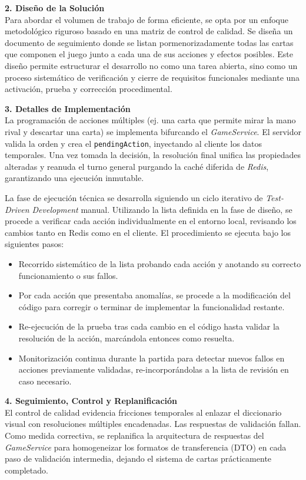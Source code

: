 \textbf{2. Diseño de la Solución} \\
Para abordar el volumen de trabajo de forma eficiente, se opta por un enfoque metodológico riguroso basado en una matriz de control de calidad. Se diseña un documento de seguimiento donde se listan pormenorizadamente todas las cartas que componen el juego junto a cada una de sus acciones y efectos posibles. Este diseño permite estructurar el desarrollo no como una tarea abierta, sino como un proceso sistemático de verificación y cierre de requisitos funcionales mediante una activación, prueba y corrección procedimental.

\textbf{3. Detalles de Implementación} \\
La programación de acciones múltiples (ej. una carta que permite mirar la mano rival y descartar una carta) se implementa bifurcando el \textit{GameService}. El servidor valida la orden y crea el \texttt{pendingAction}, inyectando al cliente los datos temporales. Una vez tomada la decisión, la resolución final unifica las propiedades alteradas y reanuda el turno general purgando la caché diferida de \textit{Redis}, garantizando una ejecución inmutable.

La fase de ejecución técnica se desarrolla siguiendo un ciclo iterativo de \textit{Test-Driven Development} manual. Utilizando la lista definida en la fase de diseño, se procede a verificar cada acción individualmente en el entorno local, revisando los cambios tanto en Redis como en el cliente. El procedimiento se ejecuta bajo los siguientes pasos:
\begin{itemize}
    \item Recorrido sistemático de la lista probando cada acción y anotando su correcto funcionamiento o sus fallos.
    \item Por cada acción que presentaba anomalías, se procede a la modificación del código para corregir o terminar de implementar la funcionalidad restante.
    \item Re-ejecución de la prueba tras cada cambio en el código hasta validar la resolución de la acción, marcándola entonces como resuelta.
    \item Monitorización continua durante la partida para detectar nuevos fallos en acciones previamente validadas, re-incorporándolas a la lista de revisión en caso necesario.
\end{itemize}

\textbf{4. Seguimiento, Control y Replanificación} \\
El control de calidad evidencia fricciones temporales al enlazar el diccionario visual con resoluciones múltiples encadenadas. Las respuestas de validación fallan. Como medida correctiva, se replanifica la arquitectura de respuestas del \textit{GameService} para homogeneizar los formatos de transferencia (DTO) en cada paso de validación intermedia, dejando el sistema de cartas prácticamente completado.

